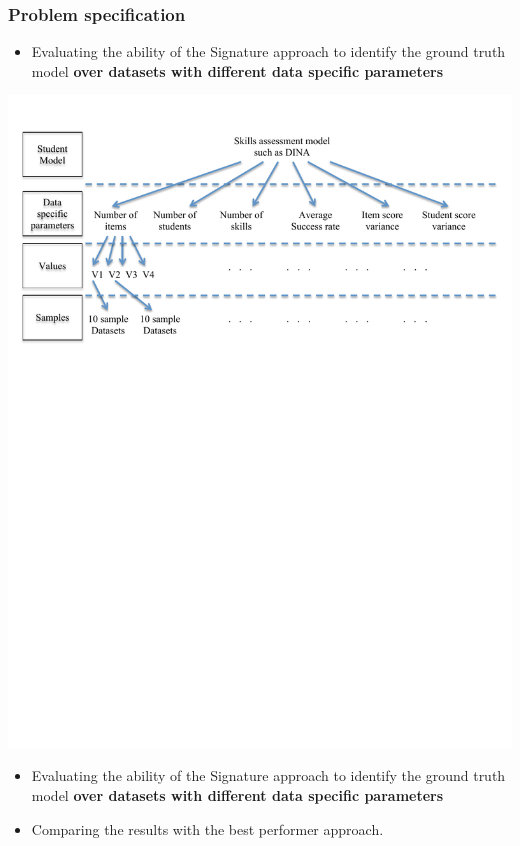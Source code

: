 \documentclass{beamer}
\begin{document}
\begin{frame}\frametitle{Problem specification}
\begin{overprint}
\begin{itemize}
	\item Evaluating the ability of the Signature approach to identify the ground truth model \textbf{over datasets with different data specific parameters}
	\end{itemize}
	\includegraphics[trim=1cm 17cm 1cm 1cm,scale=0.55]{images/Data-Gen-Break-Down.pdf}
	\onslide<2> 
	\begin{itemize}
	\item Evaluating the ability of the Signature approach to identify the ground truth model \textbf{over datasets with different data specific parameters}
	\item Comparing the results with the best performer approach.
\end{itemize}

\end{overprint}
\end{frame}
\end{document}
